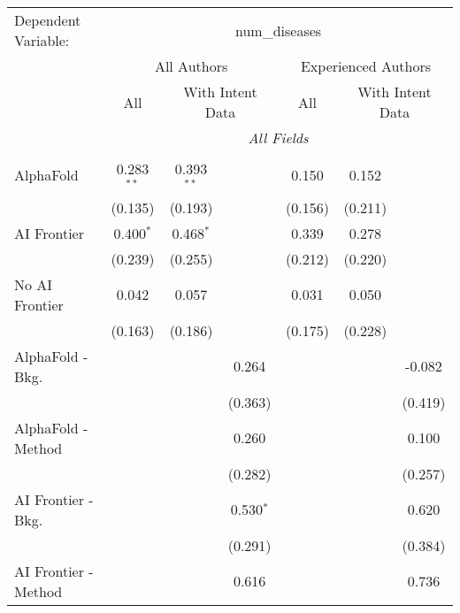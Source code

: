 \begingroup
\centering
\begin{tabular}{lcccccc}
   \tabularnewline \midrule \midrule
   Dependent Variable: & \multicolumn{6}{c}{num\_diseases}\\
 & \multicolumn{3}{c}{All Authors} & \multicolumn{3}{c}{Experienced Authors} \\
\cmidrule(lr){2-4} \cmidrule(lr){5-7}
 & \multicolumn{1}{c}{All} & \multicolumn{2}{c}{With Intent Data} & \multicolumn{1}{c}{All} & \multicolumn{2}{c}{With Intent Data} \\
\cmidrule(lr){2-2} \cmidrule(lr){3-4} \cmidrule(lr){5-5} \cmidrule(lr){6-7}
 & \multicolumn{6}{c}{\textit{All Fields}} \\ \\
   AlphaFold               & 0.283$^{**}$ & 0.393$^{**}$ &             & 0.150   & 0.152   &   \\   
                           & (0.135)      & (0.193)      &             & (0.156) & (0.211) &   \\   
   AI Frontier             & 0.400$^{*}$  & 0.468$^{*}$  &             & 0.339   & 0.278   &   \\   
                           & (0.239)      & (0.255)      &             & (0.212) & (0.220) &   \\   
   No AI Frontier          & 0.042        & 0.057        &             & 0.031   & 0.050   &   \\   
                           & (0.163)      & (0.186)      &             & (0.175) & (0.228) &   \\   
   AlphaFold - Bkg.        &              &              & 0.264       &         &         & -0.082\\   
                           &              &              & (0.363)     &         &         & (0.419)\\   
   AlphaFold - Method      &              &              & 0.260       &         &         & 0.100\\   
                           &              &              & (0.282)     &         &         & (0.257)\\   
   AI Frontier - Bkg.      &              &              & 0.530$^{*}$ &         &         & 0.620\\   
                           &              &              & (0.291)     &         &         & (0.384)\\   
   AI Frontier - Method    &              &              & 0.616       &         &         & 0.736\\   

\end{tabular}
